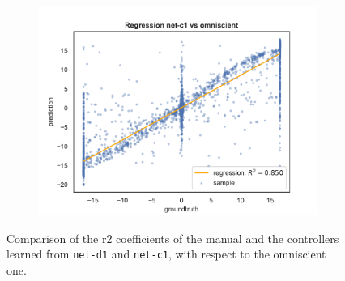 \begin{figure}[!htb]
\begin{center}
\begin{subfigure}[h]{0.49\textwidth}
		\end{subfigure}
	\end{center}
	\vspace{-0.5cm}
	\begin{center}
		\begin{subfigure}[h]{0.49\textwidth}
			\includegraphics[width=\textwidth]{contents/images/net-c1/regression-net-c1-vs-omniscient}
		\end{subfigure}
	\end{center}
	\vspace{-0.5cm}
	\caption[Evaluation of the \gls{r2} coefficients of \texttt{net-c1}.]{Comparison 
		of the \gls{r2} coefficients of the manual and the controllers learned from 
		\texttt{net-d1} and \texttt{net-c1}, with respect to the omniscient one.}
	\label{fig:net-c1r2}
\end{figure}
